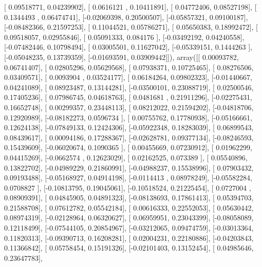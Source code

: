 \documentclass{article}
\begin{document}
       [ 0.09518771,  0.04239902],
       [ 0.0616121 ,  0.10411891],
       [ 0.04772406,  0.08527198],
       [ 0.1344493 ,  0.06474741],
       [-0.02069398,  0.20500507],
       [-0.05857321,  0.09100187],
       [-0.08482366,  0.21597253],
       [ 0.11044521,  0.05786271],
       [ 0.05650383,  0.18992472],
       [ 0.09518057,  0.02955846],
       [ 0.05091333,  0.084176  ],
       [-0.03492192,  0.04240558],
       [-0.07482446,  0.10798494],
       [ 0.03005501,  0.11627042],
       [-0.05339151,  0.1444263 ],
       [-0.05048235,  0.13739359],
       [-0.01693591,  0.03909442]]), array([[ 0.00093782,  0.06741407],
       [ 0.02805296,  0.05629568],
       [ 0.07938371,  0.10725465],
       [ 0.08276506,  0.03409571],
       [ 0.0093904 ,  0.03524177],
       [ 0.06184264,  0.09802323],
       [-0.01440667,  0.04241089],
       [ 0.08923487,  0.13144281],
       [-0.03500101,  0.23088719],
       [ 0.02500546,  0.17405236],
       [ 0.07986745,  0.04618763],
       [ 0.0481681 ,  0.21911296],
       [-0.02275431,  0.16652748],
       [ 0.00299357,  0.23448113],
       [ 0.08212022,  0.21594202],
       [-0.04818706,  0.12920989],
       [-0.08182273,  0.0596734 ],
       [ 0.00755762,  0.17780938],
       [-0.05166661,  0.12624138],
       [-0.07849133,  0.12424306],
       [-0.05922348,  0.18283039],
       [ 0.06899543,  0.08439617],
       [ 0.00094186,  0.17288367],
       [-0.02628781,  0.09377134],
       [-0.08246593,  0.15439609],
       [-0.06020674,  0.1090365 ],
       [ 0.00455669,  0.07230912],
       [ 0.01962299,  0.04415269],
       [-0.0662574 ,  0.12623029],
       [ 0.02162525,  0.073389  ],
       [ 0.05540896,  0.13822702],
       [-0.04989229,  0.21860991],
       [-0.04988237,  0.15538996],
       [ 0.07903432,  0.09193488],
       [-0.05168927,  0.04914198],
       [-0.0114413 ,  0.08978249],
       [-0.05582284,  0.0708827 ],
       [-0.10813795,  0.19045061],
       [-0.10518524,  0.21225454],
       [ 0.0727004 ,  0.08909391],
       [ 0.04845905,  0.04891323],
       [-0.08138693,  0.17861413],
       [ 0.05394703,  0.21588708],
       [ 0.07612782,  0.05542184],
       [ 0.00616333,  0.22552053],
       [ 0.05630442,  0.08974319],
       [-0.02128964,  0.06320627],
       [ 0.06959951,  0.23043399],
       [-0.08058089,  0.12118499],
       [-0.07544105,  0.20854967],
       [-0.03212065,  0.09474759],
       [-0.03013364,  0.11820313],
       [-0.09390713,  0.16208281],
       [ 0.02004231,  0.22180886],
       [-0.04203843,  0.11366842],
       [ 0.05758454,  0.15191326],
       [-0.02101403,  0.13152454],
       [ 0.04985646,  0.23647783],
\end{document}
